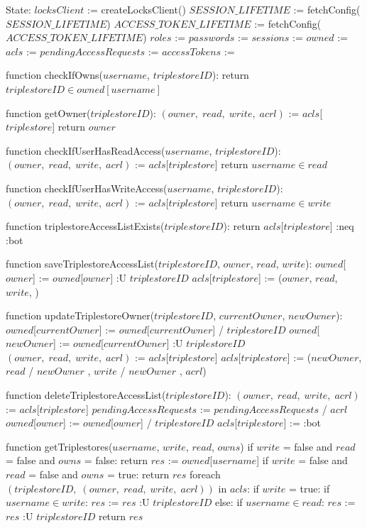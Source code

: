 State:
    $locksClient$ := createLocksClient()
    $SESSION\_LIFETIME$ := fetchConfig($SESSION\_LIFETIME$)
    $ACCESS\_TOKEN\_LIFETIME$ := fetchConfig($ACCESS\_TOKEN\_LIFETIME$)
    $roles$ := {}
    $passwords$ := {}
    $sessions$ := {}
    $owned$ := {}
    $acls$ := {}
    $pendingAccessRequests$ := {}
    $accessTokens$ := {}

function checkIfOwns($username$, $triplestoreID$):
    return $triplestoreID \in owned[username]$

function getOwner($triplestoreID$):
    $(owner, \; read, \; write, \; acrl)$ := $acls$[$triplestore$]
    return $owner$

function checkIfUserHasReadAccess($username$, $triplestoreID$):
    $(owner, \; read, \; write, \; acrl)$ := $acls$[$triplestore$]
    return $username \in read$

function checkIfUserHasWriteAccess($username$, $triplestoreID$):
    $(owner, \; read, \; write, \; acrl)$ := $acls$[$triplestore$]
    return $username \in write$

function triplestoreAccessListExists($triplestoreID$):
    return $acls$[$triplestore$] :neq :bot

function saveTriplestoreAccessList($triplestoreID$, $owner$, $read$, $write$):
    $owned$[$owner$] := $owned$[$owner$] :U { $triplestoreID$ }
    $acls$[$triplestore$] := ($owner$, $read$, $write$, {})

function updateTriplestoreOwner($triplestoreID$, $currentOwner$, $newOwner$):
    $owned$[$currentOwner$] := $owned$[$currentOwner$] / { $triplestoreID$ }
    $owned$[$newOwner$] := $owned$[$currentOwner$] :U { $triplestoreID$ }
    $(owner, \; read, \; write, \; acrl)$ := $acls$[$triplestore$]
    $acls$[$triplestore$] := ($newOwner$, $read$ / { $newOwner$ }, $write$ / { $newOwner$ }, $acrl$)

function deleteTriplestoreAccessList($triplestoreID$):
    $(owner, \; read, \; write, \; acrl)$ := $acls$[$triplestore$]
    $pendingAccessRequests$ := $pendingAccessRequests$ / $acrl$
    $owned$[$owner$] := $owned$[$owner$] / { $triplestoreID$ }
    $acls$[$triplestore$] := :bot

function getTriplestores($username$, $write$, $read$, $owns$)
    if $write$ = false and $read$ = false and $owns$ = false:
        return {}
    $res$ := $owned$[$username$]
    if $write$ = false and $read$ = false and $owns$ = true:
        return $res$
    foreach $(triplestoreID, \; (owner, \; read, \; write, \; acrl))$ in $acls$:
        if $write$ = true:
            if $username \in write$:
                $res$ := $res$ :U { $triplestoreID$ }
        else:
            if $username \in read$:
                $res$ := $res$ :U { $triplestoreID$ }
    return $res$

